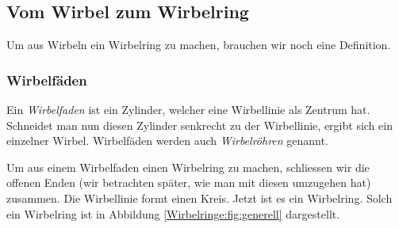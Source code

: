 \subsection{Vom Wirbel zum Wirbelring}

Um aus Wirbeln ein Wirbelring zu machen, brauchen wir noch eine Definition.

\subsubsection*{Wirbelfäden}

Ein {\em Wirbelfaden} ist ein Zylinder, welcher eine Wirbellinie als Zentrum hat.
%
Schneidet man nun diesen Zylinder senkrecht zu der Wirbellinie, ergibt sich ein einzelner Wirbel.
Wirbelfäden werden auch {\em Wirbelröhren} genannt.
%

Um aus einem Wirbelfaden einen Wirbelring zu machen, schliessen wir die offenen Enden (wir betrachten später, wie man mit diesen umzugehen hat) zusammen.
Die Wirbellinie formt einen Kreis.
Jetzt ist es ein Wirbelring. 
Solch ein Wirbelring ist in Abbildung \ref{Wirbelringe:fig:generell} dargestellt.


